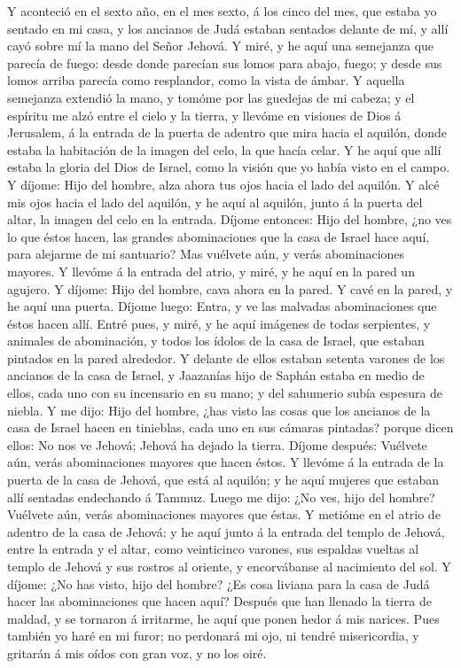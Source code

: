  Y aconteció en el sexto año, en el mes sexto, á los cinco
del mes, que estaba yo sentado en mi casa, y los ancianos de Judá
estaban sentados delante de mí, y allí cayó sobre mí la mano del Señor
Jehová.  Y miré, y he aquí una semejanza que parecía de
fuego: desde donde parecían sus lomos para abajo, fuego; y desde sus
lomos arriba parecía como resplandor, como la vista de ámbar.
 Y aquella semejanza extendió la mano, y tomóme por las
guedejas de mi cabeza; y el espíritu me alzó entre el cielo y la tierra,
y llevóme en visiones de Dios á Jerusalem, á la entrada de la puerta de
adentro que mira hacia el aquilón, donde estaba la habitación de la
imagen del celo, la que hacía celar.  Y he aquí que allí
estaba la gloria del Dios de Israel, como la visión que yo había visto
en el campo.  Y díjome: Hijo del hombre, alza ahora tus ojos
hacia el lado del aquilón. Y alcé mis ojos hacia el lado del aquilón, y
he aquí al aquilón, junto á la puerta del altar, la imagen del celo en
la entrada.  Díjome entonces: Hijo del hombre, ¿no ves lo
que éstos hacen, las grandes abominaciones que la casa de Israel hace
aquí, para alejarme de mi santuario? Mas vuélvete aún, y verás
abominaciones mayores.  Y llevóme á la entrada del atrio, y
miré, y he aquí en la pared un agujero.  Y díjome: Hijo del
hombre, cava ahora en la pared. Y cavé en la pared, y he aquí una
puerta.  Díjome luego: Entra, y ve las malvadas
abominaciones que éstos hacen allí.  Entré pues, y miré, y
he aquí imágenes de todas serpientes, y animales de abominación, y todos
los ídolos de la casa de Israel, que estaban pintados en la pared
alrededor.  Y delante de ellos estaban setenta varones de
los ancianos de la casa de Israel, y Jaazanías hijo de Saphán estaba en
medio de ellos, cada uno con su incensario en su mano; y del sahumerio
subía espesura de niebla.  Y me dijo: Hijo del hombre, ¿has
visto las cosas que los ancianos de la casa de Israel hacen en
tinieblas, cada uno en sus cámaras pintadas? porque dicen ellos: No nos
ve Jehová; Jehová ha dejado la tierra.  Díjome después:
Vuélvete aún, verás abominaciones mayores que hacen éstos. 
Y llevóme á la entrada de la puerta de la casa de Jehová, que está al
aquilón; y he aquí mujeres que estaban allí sentadas endechando á
Tammuz.  Luego me dijo: ¿No ves, hijo del hombre? Vuélvete
aún, verás abominaciones mayores que éstas.  Y metióme en
el atrio de adentro de la casa de Jehová: y he aquí junto á la entrada
del templo de Jehová, entre la entrada y el altar, como veinticinco
varones, sus espaldas vueltas al templo de Jehová y sus rostros al
oriente, y encorvábanse al nacimiento del sol.  Y díjome:
¿No has visto, hijo del hombre? ¿Es cosa liviana para la casa de Judá
hacer las abominaciones que hacen aquí? Después que han llenado la
tierra de maldad, y se tornaron á irritarme, he aquí que ponen hedor á
mis narices.  Pues también yo haré en mi furor; no
perdonará mi ojo, ni tendré misericordia, y gritarán á mis oídos con
gran voz, y no los oiré.

